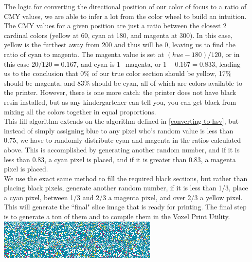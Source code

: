 \documentclass{article}
\begin{document}
\begin{multicols}{2}
\begin{tikzpicture}[x=0.75pt,y=0.75pt,yscale=-1,xscale=1]
\end{tikzpicture}

\noindent
The logic for converting the directional position of our color of focus to a ratio of CMY values, we are able to infer a lot from the color wheel to build an intuition. The CMY values for a given position are just a ratio between the closest 2 cardinal colors (yellow at 60, cyan at 180, and magenta at 300). In this case, yellow is the furthest away from 200 and thus will be 0, leaving us to find the ratio of cyan to magenta. The magenta value is set at $(hue-180)/120$, or in this case $20/120=0.167$, and cyan is 1$-$magenta, or $1-0.167=0.833$, leading us to the conclusion that 0\% of our true color section should be yellow, 17\% should be magenta, and 83\% should be cyan, all of which are colors available to the printer. However, there is one more catch: the printer does not have black resin installed, but as any kindergartener can tell you, you can get black from mixing all the colors together in equal proportions.
\\

\noindent
This fill algorithm extends on the algorithm defined in \ref{converting to hsv}, but instead of simply assigning blue to any pixel who's random value is less than 0.75, we have to randomly distribute cyan and magenta in the ratios calculated above. This is accomplished by generating another random number, and if it is less than 0.83, a cyan pixel is placed, and if it is greater than 0.83, a magenta pixel is placed. 
\\

\noindent
We use the exact same method to fill the required black sections, but rather than placing black pixels, generate another random number, if it is less than 1/3, place a cyan pixel, between 1/3 and 2/3 a magenta pixel, and over 2/3 a yellow pixel. This will generate the ``final" slice image that is ready for printing. The final step is to generate a ton of them and to compile them in the Voxel Print Utility.
\\

\noindent
\includegraphics[width=\columnwidth]{objective-color-hsv}
\\


\end{multicols}
\end{document}
